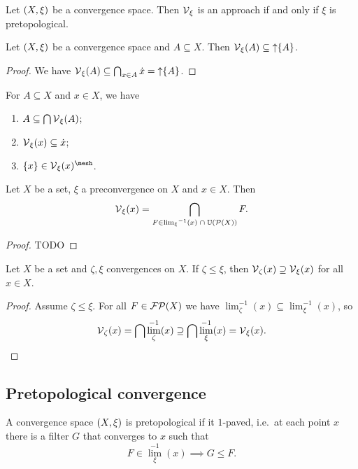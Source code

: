 \begin{lemma}
Let $\left( X,\xi \right)$ be a convergence space. Then $\operatorname{\mathcal{V}}_\xi$ is an approach \textup{if and only if} $\xi$ is pretopological.
\end{lemma}

\begin{lemma} \label{vicinityOfSetLemma}
Let $\left( X,\xi \right)$ be a convergence space and $A\subseteq X$. Then $\operatorname{\mathcal{V}}_\xi(A) \subseteq \operatorname{\uparrow}\{A\}$.
\end{lemma}
\begin{proof}
We have $\operatorname{\mathcal{V}}_\xi(A) \subseteq \bigcap_{x\in A}\dot{x} = \operatorname{\uparrow} \{A\}$. 
\end{proof}
\begin{corollary} \label{vicinityOfSetCorollary}
For $A\subseteq X$ and $x\in X$, we have
\begin{enumerate}
\item $A \subseteq \bigcap\operatorname{\mathcal{V}}_\xi(A)$;
\item $\operatorname{\mathcal{V}}_\xi(x) \subseteq \dot{x}$;
\item $\{x\}\in\vicinity_\xi(x)^{\mesh}$.
\end{enumerate}
\end{corollary}

\begin{lemma}
Let $X$ be a set, $\xi$ a preconvergence on $X$ and $x\in X$. Then
\[ \operatorname{\mathcal{V}}_\xi(x) = \bigcap_{F\in {\lim_\xi}^{-1}(x)\;\cap\; \operatorname{\mathbb{U}}(\operatorname{\mathcal{P}}(X))}F. \]
\end{lemma}
\begin{proof}
TODO
\end{proof}

\begin{lemma} \label{vicinityMapAntitone}
Let $X$ be a set and $\zeta, \xi$ convergences on $X$. If $\zeta \leq \xi$, then $\operatorname{\mathcal{V}}_\zeta(x) \supseteq \operatorname{\mathcal{V}}_\xi(x)$ for all $x\in X$.
\end{lemma}
\begin{proof}
Assume $\zeta \leq \xi$. For all $F\in \operatorname{\mathcal{FP}}(X)$ we have $\lim_\zeta^{-1}(x) \subseteq \lim_\xi^{-1}(x)$, so
\[ \operatorname{\mathcal{V}}_\zeta(x) = \bigcap \lim_\zeta^{-1}(x) \supseteq \bigcap \lim_\xi^{-1}(x) = \operatorname{\mathcal{V}}_\xi(x). \]
\end{proof}

\subsection{Pretopological convergence}
A convergence space $\left( X,\xi \right)$ is pretopological if it $1$-paved, i.e.\ at each point $x$ there is a filter $G$ that converges to $x$ such that
\[ F\in {\lim}_\xi^{-1}(x) \implies G \leq F. \]

